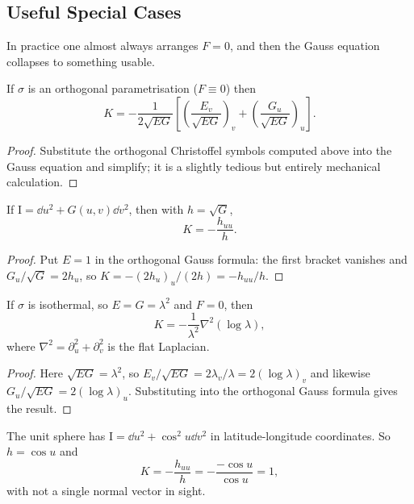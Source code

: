 \documentclass[a4paper]{scrartcl}
\begin{document}
\subsection{Useful Special Cases}

In practice one almost always arranges $F = 0$, and then the Gauss equation collapses to something usable.

\begin{corollary}
    If $\sigma$ is an orthogonal parametrisation ($F \equiv 0$) then
    $$
    K = -\frac{1}{2\sqrt{EG}}\left[\left(\frac{E_v}{\sqrt{EG}}\right)_v + \left(\frac{G_u}{\sqrt{EG}}\right)_u\right].
    $$
\end{corollary}
\begin{proof}
    Substitute the orthogonal Christoffel symbols computed above into the Gauss equation and simplify; it is a slightly tedious but entirely mechanical calculation.
\end{proof}

\begin{corollary}
    If $\mathrm{I} = \dd u^2 + G(u,v)\dd v^2$, then with $h = \sqrt{G}$,
    $$
    K = -\frac{h_{uu}}{h}.
    $$
\end{corollary}
\begin{proof}
    Put $E = 1$ in the orthogonal Gauss formula: the first bracket vanishes and $G_u/\sqrt{G} = 2h_u$, so $K = -(2h_u)_u/(2h) = -h_{uu}/h$.
\end{proof}

\begin{corollary}
    If $\sigma$ is isothermal, so $E = G = \lambda^2$ and $F = 0$, then
    $$
    K = -\frac{1}{\lambda^2}\nabla^2\left(\log\lambda\right),
    $$
    where $\nabla^2 = \partial_u^2 + \partial_v^2$ is the flat Laplacian.
\end{corollary}
\begin{proof}
    Here $\sqrt{EG} = \lambda^2$, so $E_v/\sqrt{EG} = 2\lambda_v/\lambda = 2(\log\lambda)_v$ and likewise $G_u/\sqrt{EG} = 2(\log\lambda)_u$. Substituting into the orthogonal Gauss formula gives the result.
\end{proof}

\begin{example}
    The unit sphere has $\mathrm{I} = \dd u^2 + \cos^2 u \dd v^2$ in latitude-longitude coordinates. So $h = \cos u$ and
    $$
    K = -\frac{h_{uu}}{h} = -\frac{-\cos u}{\cos u} = 1,
    $$
    with not a single normal vector in sight.
\end{example}
\end{document}
